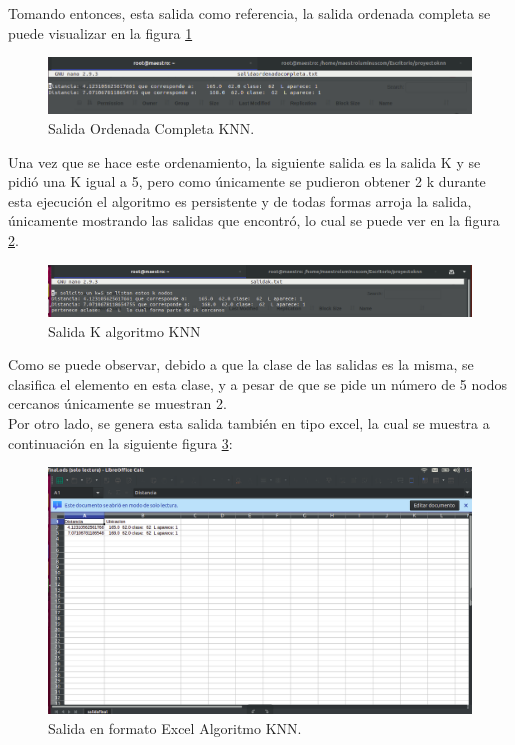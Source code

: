 Tomando entonces, esta salida como referencia, la salida ordenada completa se puede visualizar en la figura \ref{fig:knn2ex2}
\begin{figure}[H]
	\begin{center}
		\hypertarget{fig:knn2ex2}{\hspace{1pt}}
		\includegraphics[width=.9\textwidth]{capitulo4a/images/salidaordenadacompleta.png}
		\caption{Salida Ordenada Completa KNN.}
		\label{fig:knn2ex2}
	\end{center}
\end{figure}
Una vez que se hace este ordenamiento, la siguiente salida es la salida K y se pidió una K igual a 5, pero como únicamente se pudieron obtener 2 k durante esta ejecución el algoritmo es persistente y de todas formas arroja la salida, únicamente mostrando las salidas que encontró, lo cual se puede ver en la figura \ref{fig:knn2ex3}.\\
\begin{figure}[H]
	\begin{center}
		\hypertarget{fig:knn2ex3}{\hspace{1pt}}
		\includegraphics[width=.9\textwidth]{capitulo4a/images/salidak.png}
		\caption{Salida K algoritmo KNN}
		\label{fig:knn2ex3}
	\end{center}
\end{figure} 
Como se puede observar, debido a que la clase de las salidas es la misma, se clasifica el elemento en esta clase, y a pesar de que se pide un número de 5 nodos cercanos únicamente se muestran 2. 
\\
Por otro lado, se genera esta salida también en tipo excel, la cual se muestra a continuación en la siguiente figura \ref{fig:knn2ex4}:
\begin{figure}[H]
	\begin{center}
		\hypertarget{fig:knn2ex4}{\hspace{1pt}}
		\includegraphics[width=.9\textwidth]{capitulo4a/images/salidaexcel.png}
		\caption{Salida en formato Excel Algoritmo KNN.}
		\label{fig:knn2ex4}
	\end{center}
\end{figure} 
